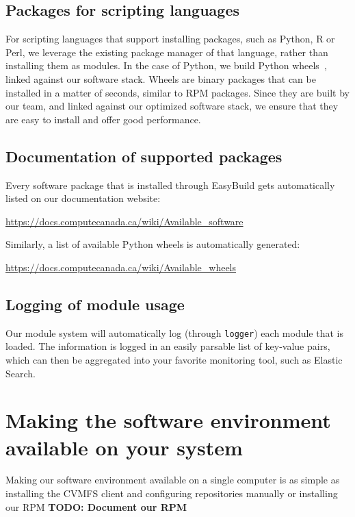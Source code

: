 \documentclass[sigconf]{acmart}
\begin{document}
\subsection{Packages for scripting languages}
\label{sub:Packages_for_scripting_languages}
For scripting languages that support installing packages, such as Python, R or Perl, we leverage the existing package manager of that language, rather than installing them as modules. In the case of Python, we build Python wheels~\cite{Wheels}, linked against our software stack. Wheels are binary packages that can be installed in a matter of seconds, similar to RPM packages. Since they are built by our team, and linked against our optimized software stack, we ensure that they are easy to install and offer good performance.

\subsection{Documentation of supported packages}
\label{sub:Documentation}
Every software package that is installed through EasyBuild gets automatically listed on our documentation website:
\begin{center}
    \url{https://docs.computecanada.ca/wiki/Available_software}
\end{center}
Similarly, a list of available Python wheels is automatically generated:
\begin{center}
\url{https://docs.computecanada.ca/wiki/Available_wheels}    
\end{center}

\subsection{Logging of module usage}
\label{sub:Logging}
Our module system will automatically log (through \texttt{logger}) each module that is loaded. The information is logged in an easily parsable list of key-value pairs, which can then be aggregated into your favorite monitoring tool, such as Elastic Search. 

\section{Making the software environment available on your system}
\label{sec:Making_it_available}
Making our software environment available on a single computer is as simple as installing the CVMFS client and configuring repositories manually or installing our RPM
\textbf{TODO: Document our RPM}
\end{document}
